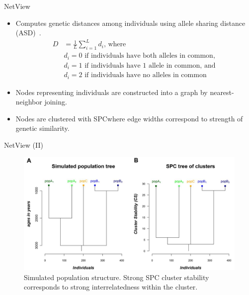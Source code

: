 \documentclass{beamer}
\begin{document}
\begin{frame}{NetView\cite{neuditschko_netview:_2012}}
  \begin{itemize}
    \item Computes genetic distances among individuals using allele sharing
      distance (ASD)~\cite{gao_using_2009,purcell_plink:_2007}.
      \begin{align*}
        D &= \frac{1}{L} \sum_{i=1}^L d_i\textrm{, where} \\
          &d_i = 0\textrm{ if individuals have both alleles in common, } \\
          &d_i = 1\textrm{ if individuals have 1 allele in common, and } \\
          &d_i = 2\textrm{ if individuals have no alleles in common}
      \end{align*}
    \item Nodes representing individuals are constructed into a graph by
      nearest-neighbor joining.
    \item Nodes are clustered with SPC\@ where edge widths correspond to
      strength of genetic similarity.
  \end{itemize}
\end{frame}

\begin{frame}{NetView (II)}
  \begin{figure}
    \includegraphics[width=1\linewidth,keepaspectratio]{../Figures/fig6ab.png}
    \caption{Simulated population structure. Strong SPC cluster stability
    corresponds to strong interrelatedness within the cluster.}
  \end{figure}
\end{frame}
\end{document}
